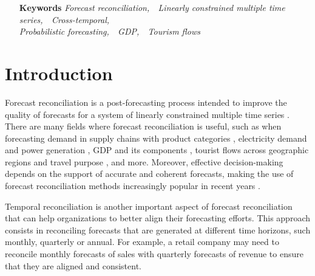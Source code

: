 \documentclass[a4paper,11pt]{article}
\theoremstyle{definition}
\begin{document}
\begin{itemize}[nosep, align=left, leftmargin = !]
	\item[\textbf{Keywords}] \textit{Forecast reconciliation,~~Linearly constrained multiple time series,~~Cross-temporal, \\ Probabilistic forecasting,~~GDP,~~Tourism flows}
\end{itemize}
\vfill

\newpage
{}


\section{Introduction}

Forecast reconciliation is a post-forecasting process intended to improve the quality of forecasts for a system of linearly constrained multiple time series \citep{hyndman2011, panagiotelis2021}. There are many fields where forecast reconciliation is useful, such as when forecasting demand in supply chains with product categories \citep{punia2020, kourentzes2021}, electricity demand and power generation \citep{spiliotis2020, bentaieb2021}, GDP and its components \citep{athanasopoulos2020}, tourist flows across geographic regions and travel purpose \citep{kourentzes2019}, and more. Moreover, effective decision-making depends on the support of accurate and coherent forecasts, making the use of forecast reconciliation methods increasingly popular in recent years \citep{athanasopoulos2023}. 

Temporal reconciliation is another important aspect of forecast reconciliation that can help organizations to better align their forecasting efforts. This approach consists in reconciling forecasts that are generated at different time horizons, such monthly, quarterly or annual. For example, a retail company may need to reconcile monthly forecasts of sales with quarterly forecasts of revenue to ensure that they are aligned and consistent. %
\end{document}
